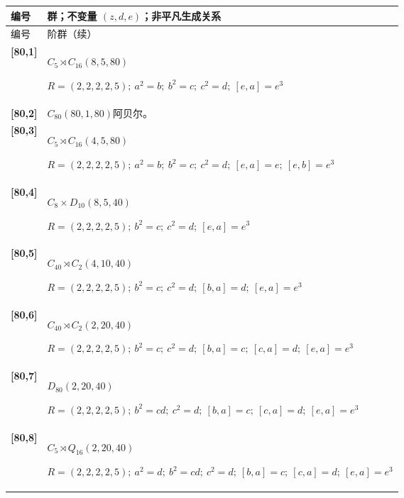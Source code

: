 \documentclass[UTF8,fontset=fandol,11pt,a4paper]{ctexart}
\begin{document}
\begin{longtable}{@{}p{17mm}>{\raggedright\arraybackslash}p{141mm}@{}}

\toprule 编号 & 群；不变量 $(z,d,e)$；非平凡生成关系\\\midrule\endfirsthead

\toprule 编号 & 80 阶群（续）\\\midrule\endhead\bottomrule\endfoot

\textbf{[80,1]} & $C_{5}\rtimes C_{16}$\quad $(8,5,80)$\par\(R=(2,2,2,2,5);\allowbreak\ a^{2}=b;\allowbreak\ b^{2}=c;\allowbreak\ c^{2}=d;\allowbreak\ [e,a]=e^{3}\)\\[3pt]

\textbf{[80,2]} & $C_{80}$\quad $(80,1,80)$\quad 阿贝尔。\\[3pt]

\textbf{[80,3]} & $C_{5}\rtimes C_{16}$\quad $(4,5,80)$\par\(R=(2,2,2,2,5);\allowbreak\ a^{2}=b;\allowbreak\ b^{2}=c;\allowbreak\ c^{2}=d;\allowbreak\ [e,a]=e;\allowbreak\ [e,b]=e^{3}\)\\[3pt]

\textbf{[80,4]} & $C_{8}\times D_{10}$\quad $(8,5,40)$\par\(R=(2,2,2,2,5);\allowbreak\ b^{2}=c;\allowbreak\ c^{2}=d;\allowbreak\ [e,a]=e^{3}\)\\[3pt]

\textbf{[80,5]} & $C_{40}\rtimes C_{2}$\quad $(4,10,40)$\par\(R=(2,2,2,2,5);\allowbreak\ b^{2}=c;\allowbreak\ c^{2}=d;\allowbreak\ [b,a]=d;\allowbreak\ [e,a]=e^{3}\)\\[3pt]

\textbf{[80,6]} & $C_{40}\rtimes C_{2}$\quad $(2,20,40)$\par\(R=(2,2,2,2,5);\allowbreak\ b^{2}=c;\allowbreak\ c^{2}=d;\allowbreak\ [b,a]=c;\allowbreak\ [c,a]=d;\allowbreak\ [e,a]=e^{3}\)\\[3pt]

\textbf{[80,7]} & $D_{80}$\quad $(2,20,40)$\par\(R=(2,2,2,2,5);\allowbreak\ b^{2}=cd;\allowbreak\ c^{2}=d;\allowbreak\ [b,a]=c;\allowbreak\ [c,a]=d;\allowbreak\ [e,a]=e^{3}\)\\[3pt]

\textbf{[80,8]} & $C_{5}\rtimes Q_{16}$\quad $(2,20,40)$\par\(R=(2,2,2,2,5);\allowbreak\ a^{2}=d;\allowbreak\ b^{2}=cd;\allowbreak\ c^{2}=d;\allowbreak\ [b,a]=c;\allowbreak\ [c,a]=d;\allowbreak\ [e,a]=e^{3}\)\\[3pt]


\end{longtable}
\end{document}
